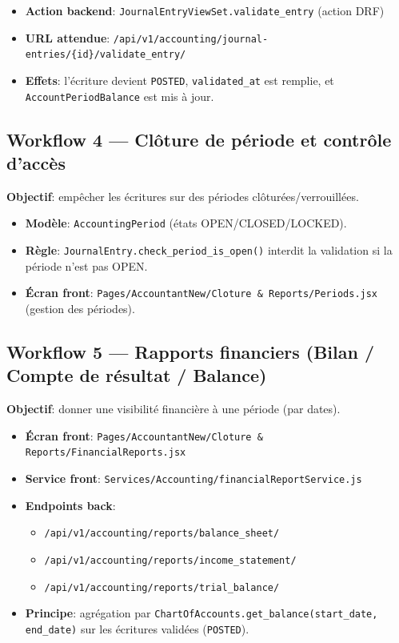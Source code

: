 \documentclass[12pt,a4paper]{article}
\begin{document}
\begin{itemize}[leftmargin=1.2cm]
  \item \textbf{Action backend}: \texttt{JournalEntryViewSet.validate\_entry} (action DRF)
  \item \textbf{URL attendue}: \texttt{/api/v1/accounting/journal-entries/\{id\}/validate\_entry/}
  \item \textbf{Effets}: l’écriture devient \texttt{POSTED}, \texttt{validated\_at} est remplie, et \texttt{AccountPeriodBalance} est mis à jour.
\end{itemize}

\subsection{Workflow 4 --- Clôture de période et contrôle d’accès}
\textbf{Objectif}: empêcher les écritures sur des périodes clôturées/verrouillées.

\begin{itemize}[leftmargin=1.2cm]
  \item \textbf{Modèle}: \texttt{AccountingPeriod} (états OPEN/CLOSED/LOCKED).
  \item \textbf{Règle}: \texttt{JournalEntry.check\_period\_is\_open()} interdit la validation si la période n’est pas OPEN.
  \item \textbf{Écran front}: \texttt{Pages/AccountantNew/Cloture \& Reports/Periods.jsx} (gestion des périodes).
\end{itemize}

\subsection{Workflow 5 --- Rapports financiers (Bilan / Compte de résultat / Balance)}
\textbf{Objectif}: donner une visibilité financière à une période (par dates).

\begin{itemize}[leftmargin=1.2cm]
  \item \textbf{Écran front}: \texttt{Pages/AccountantNew/Cloture \& Reports/FinancialReports.jsx}
  \item \textbf{Service front}: \texttt{Services/Accounting/financialReportService.js}
  \item \textbf{Endpoints back}:
  \begin{itemize}[leftmargin=1.2cm]
    \item \texttt{/api/v1/accounting/reports/balance\_sheet/}
    \item \texttt{/api/v1/accounting/reports/income\_statement/}
    \item \texttt{/api/v1/accounting/reports/trial\_balance/}
  \end{itemize}
  \item \textbf{Principe}: agrégation par \texttt{ChartOfAccounts.get\_balance(start\_date, end\_date)} sur les écritures validées (\texttt{POSTED}).
\end{itemize}
\end{document}
